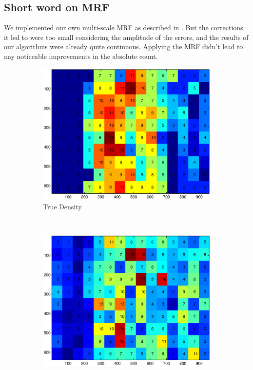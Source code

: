 \documentclass[a4paper,11pt, french]{article}
\begin{document}
\subsection*{Short word on MRF}
We implemented our own multi-scale MRF as described in \cite{multisource, mrf}. But the corrections it led to were too small considering the amplitude of the errors, and the results of our algorithms were already quite continuous. Applying the MRF didn't lead to any noticeable improvements in the absolute count.
\begin{figure}[h!]
        \centering
        \begin{subfigure}[b]{0.3\textwidth}
	  \includegraphics[width=\textwidth]{figures/mrf_true.eps}
          \caption{True Density}
        \end{subfigure}
        ~
        \begin{subfigure}[b]{0.3\textwidth}
	  \includegraphics[width=\textwidth]{figures/mrf_before.eps}

\end{subfigure}
\end{figure}
\end{document}
